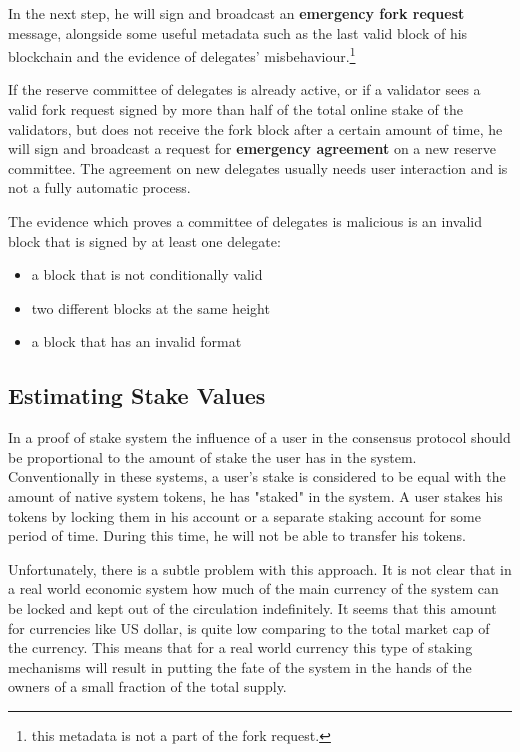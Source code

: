 In the next step, he will sign and broadcast an \textbf{emergency fork request} message, alongside some useful metadata
such as the last valid block of his blockchain and the evidence of delegates' misbehaviour.\footnote{this metadata is
not a part of the fork request.}

If the reserve committee of delegates is already active, or if a validator sees a valid fork request signed
by more than half of the total online stake of the validators, but does not receive the fork
block after a certain amount of time, he will sign and broadcast a request for
\textbf{emergency agreement} on a new reserve committee. The agreement on new delegates usually needs user
interaction and is not a fully automatic process.

The evidence which proves a committee of delegates is malicious is an invalid block that is signed by at least
one delegate:
\begin{itemize}
    \item a block that is not conditionally valid
    \item two different blocks at the same height
    \item a block that has an invalid format
\end{itemize}

\subsection{Estimating Stake Values}\label{subsec:user's-stake}

In a proof of stake system the influence of a user in the consensus protocol should be proportional to the amount
of stake the user has in the system. Conventionally in these systems, a user's stake is considered to be equal with the
amount of native system tokens, he has "staked" in the system. A user stakes his tokens by locking them in
his account or a separate staking account for some period of time. During this time, he will not be able to transfer
his tokens.

Unfortunately, there is a subtle problem with this approach. It is not clear that in a real world economic system
how much of the main currency of the system can be locked and kept out of the circulation indefinitely. It seems that
this amount for currencies like US dollar, is quite low comparing to the total market cap of the currency.
This means that for a real world currency this type of staking mechanisms will result in putting the
fate of the system in the hands of the owners of a small fraction of the total supply.

